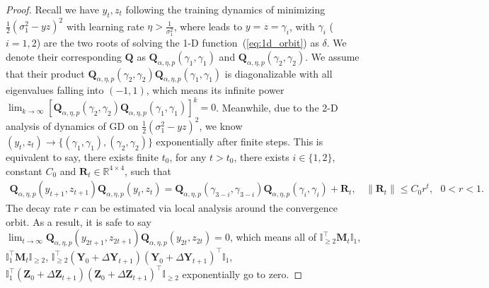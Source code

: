 \documentclass{article}
\theoremstyle{plain}
\theoremstyle{remark}
\newcommand{\norm}[1]{\left\lVert#1\right\rVert}
\def\R{\mathbb{R}}
\def\bY{\mathbf{Y}}
\def\bZ{\mathbf{Z}}
\begin{document}
\begin{proof}
    Recall we have $y_t, z_t$ following the training dynamics of minimizing $\frac{1}{2}(\sigma_1^2-y z)^2$ with learning rate $\eta>\frac{1}{\sigma_1^2}$, where leads to $y=z=\gamma_i$, with $\gamma_i$ ($i=1,2$) are the two roots of solving the 1-D function~(\ref{eq:1d_orbit}) as $\delta$. We denote their corresponding $\mathbf{Q}$ as
    $\mathbf{Q}_{\alpha,\eta,p}(\gamma_1, \gamma_1)$ and $\mathbf{Q}_{\alpha,\eta,p}(\gamma_2, \gamma_2)$. We assume that their product $\mathbf{Q}_{\alpha,\eta,p}(\gamma_2, \gamma_2)\mathbf{Q}_{\alpha,\eta,p}(\gamma_1, \gamma_1)$ is diagonalizable with all eigenvalues falling into $(-1,1)$, which means its infinite power $\lim_{k\rightarrow \infty}[\mathbf{Q}_{\alpha,\eta,p}(\gamma_2, \gamma_2)\mathbf{Q}_{\alpha,\eta,p}(\gamma_1, \gamma_1)]^{k} = 0$. Meanwhile, due to the 2-D analysis of dynamics of GD on $\frac{1}{2}(\sigma_1^2-y z)^2$, we know $(y_t, z_t)\rightarrow \{(\gamma_1,\gamma_1), (\gamma_2, \gamma_2)\}$ exponentially after finite steps. This is equivalent to say, there exists finite $t_0$, for any $t>t_0$, there exists $i\in\{1,2\}$, constant $C_0$ and $\mathbf{R}_t\in\R^{4\times4}$, such that
    \begin{gather*}
        \mathbf{Q}_{\alpha,\eta,p}(y_{t+1}, z_{t+1})\mathbf{Q}_{\alpha,\eta,p}(y_t, z_t) = \mathbf{Q}_{\alpha,\eta,p}(\gamma_{3-i}, \gamma_{3-i})\mathbf{Q}_{\alpha,\eta,p}(\gamma_i, \gamma_i) + \mathbf{R}_{t}, ~~~~ \norm{\mathbf{R}_{t}}\le C_0 r^t, ~~~0<r<1.
    \end{gather*}
    The decay rate $r$ can be estimated via local analysis around the convergence orbit.
    As a result, it is safe to say $\lim_{t\rightarrow\infty}\mathbf{Q}_{\alpha,\eta,p}(y_{2t+1}, z_{2t+1})\mathbf{Q}_{\alpha,\eta,p}(y_{2t}, z_{2t})=0$, which means all of $\mathbb{I}_{\ge2}^\top\mathbf{M}_t\mathbb{I}_1$, $\mathbb{I}_{1}^\top\mathbf{M}_t\mathbb{I}_{\ge2}$, $\mathbb{I}_{\ge2}^\top\left(\bY_0+\Delta\bY_{t+1}\right)\left(\bY_0+\Delta\bY_{t+1}\right)^\top\mathbb{I}_{1}$, $\mathbb{I}_{1}^\top\left(\bZ_0+\Delta\bZ_{t+1}\right)\left(\bZ_0+\Delta\bZ_{t+1}\right)^\top\mathbb{I}_{\ge2}$ exponentially go to zero.


\end{proof}
\end{document}
